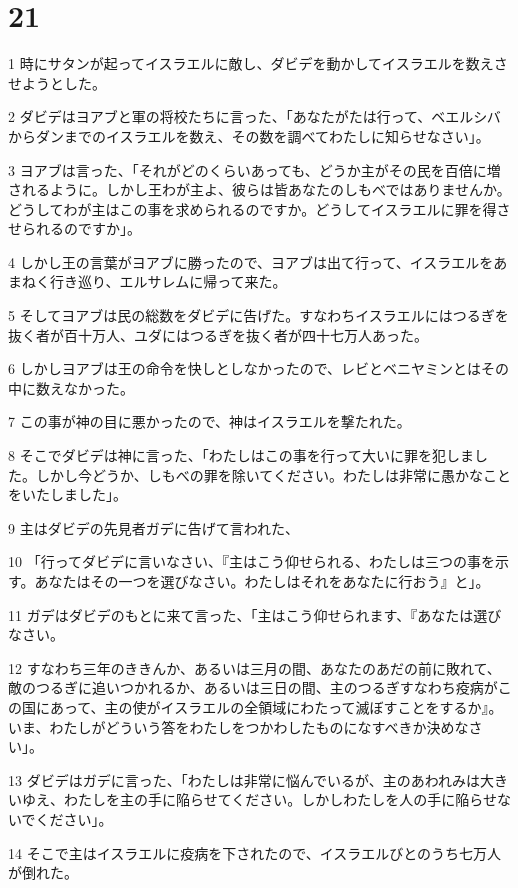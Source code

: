 \chapter{21}

\par 1 時にサタンが起ってイスラエルに敵し、ダビデを動かしてイスラエルを数えさせようとした。
\par 2 ダビデはヨアブと軍の将校たちに言った、「あなたがたは行って、ベエルシバからダンまでのイスラエルを数え、その数を調べてわたしに知らせなさい」。
\par 3 ヨアブは言った、「それがどのくらいあっても、どうか主がその民を百倍に増されるように。しかし王わが主よ、彼らは皆あなたのしもべではありませんか。どうしてわが主はこの事を求められるのですか。どうしてイスラエルに罪を得させられるのですか」。
\par 4 しかし王の言葉がヨアブに勝ったので、ヨアブは出て行って、イスラエルをあまねく行き巡り、エルサレムに帰って来た。
\par 5 そしてヨアブは民の総数をダビデに告げた。すなわちイスラエルにはつるぎを抜く者が百十万人、ユダにはつるぎを抜く者が四十七万人あった。
\par 6 しかしヨアブは王の命令を快しとしなかったので、レビとベニヤミンとはその中に数えなかった。
\par 7 この事が神の目に悪かったので、神はイスラエルを撃たれた。
\par 8 そこでダビデは神に言った、「わたしはこの事を行って大いに罪を犯しました。しかし今どうか、しもべの罪を除いてください。わたしは非常に愚かなことをいたしました」。
\par 9 主はダビデの先見者ガデに告げて言われた、
\par 10 「行ってダビデに言いなさい、『主はこう仰せられる、わたしは三つの事を示す。あなたはその一つを選びなさい。わたしはそれをあなたに行おう』と」。
\par 11 ガデはダビデのもとに来て言った、「主はこう仰せられます、『あなたは選びなさい。
\par 12 すなわち三年のききんか、あるいは三月の間、あなたのあだの前に敗れて、敵のつるぎに追いつかれるか、あるいは三日の間、主のつるぎすなわち疫病がこの国にあって、主の使がイスラエルの全領域にわたって滅ぼすことをするか』。いま、わたしがどういう答をわたしをつかわしたものになすべきか決めなさい」。
\par 13 ダビデはガデに言った、「わたしは非常に悩んでいるが、主のあわれみは大きいゆえ、わたしを主の手に陥らせてください。しかしわたしを人の手に陥らせないでください」。
\par 14 そこで主はイスラエルに疫病を下されたので、イスラエルびとのうち七万人が倒れた。
